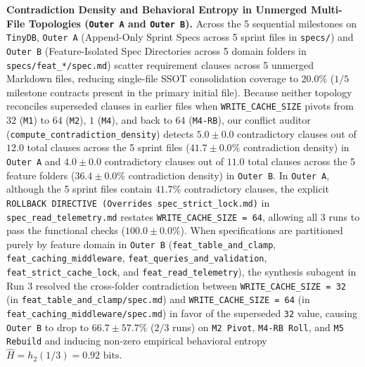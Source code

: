 \documentclass[11pt,a4paper,copyright]{google}
\begin{document}
\textbf{Contradiction Density and Behavioral Entropy in Unmerged Multi-File Topologies (\texttt{Outer A} and \texttt{Outer B}).} Across the 5 sequential milestones on \texttt{TinyDB}, \texttt{Outer A} (Append-Only Sprint Specs across 5 sprint files in \texttt{specs/}) and \texttt{Outer B} (Feature-Isolated Spec Directories across 5 domain folders in \texttt{specs/feat\_*/spec.md}) scatter requirement clauses across 5 unmerged Markdown files, reducing single-file SSOT consolidation coverage to $20.0\%$ ($1/5$ milestone contracts present in the primary initial file). Because neither topology reconciles superseded clauses in earlier files when \texttt{WRITE\_CACHE\_SIZE} pivots from $32$ (\texttt{M1}) to $64$ (\texttt{M2}), $1$ (\texttt{M4}), and back to $64$ (\texttt{M4-RB}), our conflict auditor (\texttt{compute\_\allowbreak contradiction\_\allowbreak density}) detects $5.0 \pm 0.0$ contradictory clauses out of $12.0$ total clauses across the 5 sprint files ($41.7 \pm 0.0\%$ contradiction density) in \texttt{Outer A} and $4.0 \pm 0.0$ contradictory clauses out of $11.0$ total clauses across the 5 feature folders ($36.4 \pm 0.0\%$ contradiction density) in \texttt{Outer B}. In \texttt{Outer A}, although the 5 sprint files contain $41.7\%$ contradictory clauses, the explicit \texttt{ROLLBACK DIRECTIVE (Overrides spec\_strict\_lock.md)} in \texttt{spec\_read\_telemetry.md} restates \texttt{WRITE\_CACHE\_SIZE = 64}, allowing all 3 runs to pass the functional checks ($100.0 \pm 0.0\%$). When specifications are partitioned purely by feature domain in \texttt{Outer B} (\texttt{feat\_\allowbreak table\_\allowbreak and\_\allowbreak clamp}, \texttt{feat\_\allowbreak caching\_\allowbreak middleware}, \texttt{feat\_\allowbreak queries\_\allowbreak and\_\allowbreak validation}, \texttt{feat\_\allowbreak strict\_\allowbreak cache\_\allowbreak lock}, and \texttt{feat\_\allowbreak read\_\allowbreak telemetry}), the synthesis subagent in Run 3 resolved the cross-folder contradiction between \texttt{WRITE\_CACHE\_SIZE = 32} (in \texttt{feat\_\allowbreak table\_\allowbreak and\_\allowbreak clamp/\allowbreak spec.md}) and \texttt{WRITE\_CACHE\_SIZE = 64} (in \texttt{feat\_\allowbreak caching\_\allowbreak middleware/\allowbreak spec.md}) in favor of the superseded \texttt{32} value, causing \texttt{Outer B} to drop to $66.7 \pm 57.7\%$ ($2/3$ runs) on \texttt{M2 Pivot}, \texttt{M4-RB Roll}, and \texttt{M5 Rebuild} and inducing non-zero empirical behavioral entropy $\hat{H} = h_2(1/3) = 0.92\text{ bits}$.
\end{document}
